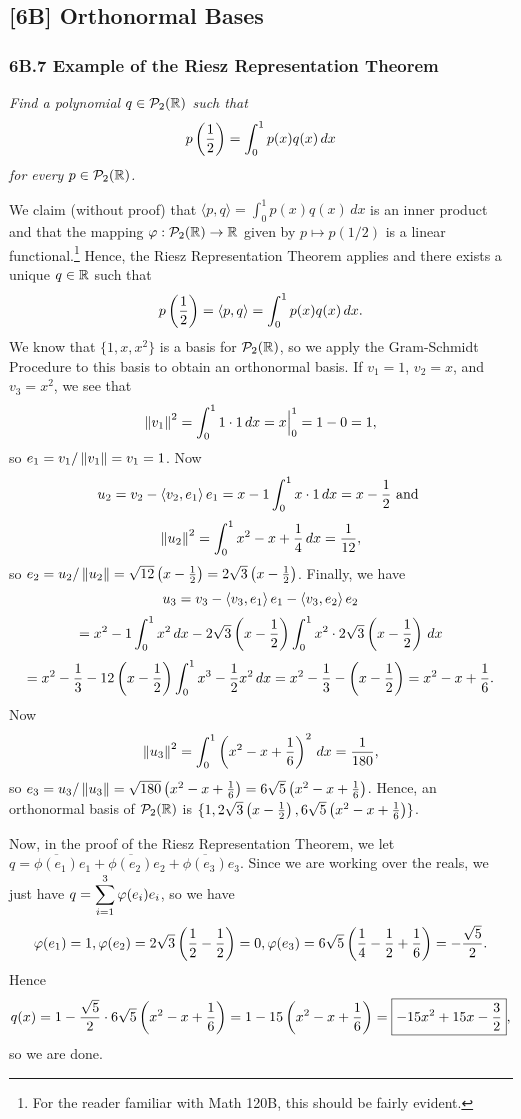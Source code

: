 \documentclass{article}
\begin{document}
\subsection*{[6B] Orthonormal Bases}
\subsubsection*{6B.7 Example of the Riesz Representation Theorem}
\textit{Find a polynomial $q\in\mathcal P_2(\mathbb R)$ such that}
$$p\left(\frac 12 \right) = \int_0^1 p(x) q(x)\, dx$$
\textit{for every $p\in\mathcal P_2(\mathbb R)$.}

\begin{solution}
We claim (without proof) that $\langle p, q\rangle = \int_0^1 p(x)q(x)\, dx$ is an inner product and that the mapping $\varphi: \mathcal P_2(\mathbb R) \to \mathbb R$ given by $p\mapsto p(1/2)$ is a linear functional.\footnote{For the reader familiar with Math 120B, this should be fairly evident.} Hence, the Riesz Representation Theorem applies and there exists a unique $q\in\mathbb R$ such that
$$p\left(\frac 12 \right) = \left\langle p,q\right\rangle = \int_0^1 p(x)q(x)\, dx.$$
We know that $\{1, x, x^2\}$ is a basis for $\mathcal P_2(\mathbb R)$, so we apply the Gram-Schmidt Procedure to this basis to obtain an orthonormal basis. If $v_1 = 1$, $v_2 = x$, and $v_3 = x^2$, we see that
$$\left\Vert v_1\right\Vert^2 = \int_0^1 1\cdot 1\, dx  = x\Big|_0^1 = 1-0 = 1,$$
so $e_1 = v_1/\left\Vert v_1\right\Vert = v_1 = 1$. Now
$$u_2 = v_2 - \left\langle v_2,e_1\right\rangle e_1 = x - 1\int_0^1 x\cdot 1\, dx = x - \frac 12 \textrm{ and }$$
$$\left\Vert u_2\right\Vert^2 = \int_0^1 x^2-x+\frac 14\, dx = \frac 1{12},$$
so $e_2 = u_2/\left\Vert u_2\right\Vert = \sqrt{12}\left(x-\frac 12 \right) = 2\sqrt 3\left(x-\frac 12 \right)$. Finally, we have
$$u_3 = v_3 - \left\langle v_3,e_1\right\rangle e_1 - \left\langle v_3,e_2\right\rangle e_2$$
$$ = x^2 -1\int_0^1 x^2 \, dx - 2\sqrt 3\left(x-\frac 12 \right)\int_0^1 x^2 \cdot 2\sqrt 3\left(x-\frac 12 \right)\, dx$$
$$=x^2 - \frac 13 - 12\left(x-\frac 12 \right)\int_0^1 x^3  -\frac 12x^2 \, dx = x^2 - \frac 13 - \left(x-\frac 12 \right) = x^2 - x + \frac 16.$$
Now
$$\left\Vert u_3\right\Vert^2 = \int_0^1\left(x^2 - x + \frac 16 \right)^2\, dx = \frac 1{180},$$
so $e_3 = u_3/\left\Vert u_3\right\Vert = \sqrt{180}\left(x^2 - x + \frac 16 \right) = 6\sqrt 5\left(x^2-x+\frac 16 \right)$. Hence, an orthonormal basis of $\mathcal P_2(\mathbb R)$ is $\{1, 2\sqrt 3\left(x-\frac 12 \right), 6\sqrt 5\left(x^2-x+\frac 16 \right)\}$.

Now, in the proof of the Riesz Representation Theorem, we let $q = \overline{\phi(e_1)}e_1 + \overline{\phi(e_2)}e_2 + \overline{\phi(e_3)}e_3$. Since we are working over the reals, we just have $q = \displaystyle\sum_{i=1}^3 \varphi(e_i)e_i$, so we have
$$\varphi(e_1) = 1, \varphi(e_2)  = 2\sqrt 3\left(\frac 12-\frac 12 \right) = 0, \varphi(e_3) = 6\sqrt 5\left(\frac 14 - \frac 12 + \frac 16 \right) = -\frac {\sqrt 5}{2}.$$
Hence
$$q(x) = 1- \frac{\sqrt 5}2 \cdot 6\sqrt 5\left(x^2 - x + \frac 16 \right) = 1 - 15\left(x^2 - x + \frac 16 \right) = \boxed{-15x^2 + 15x-\frac 32},$$
so we are done.
\end{solution}
\end{document}
